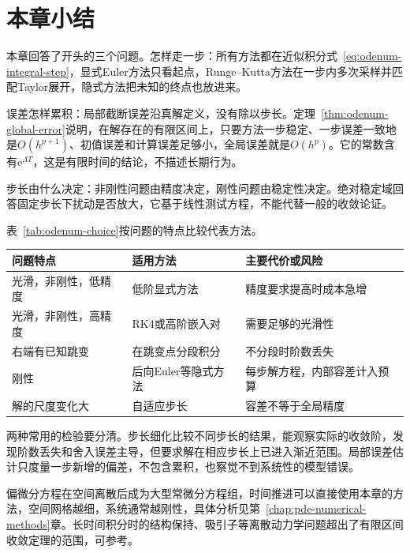 \section{本章小结}
\label{sec:odenum-summary}

本章回答了开头的三个问题。怎样走一步：所有方法都在近似积分式~\eqref{eq:odenum-integral-step}，显式Euler方法只看起点，Runge--Kutta方法在一步内多次采样并匹配Taylor展开，隐式方法把未知的终点也放进来。

误差怎样累积：局部截断误差沿真解定义，没有除以步长。定理~\ref{thm:odenum-global-error}说明，在解存在的有限区间上，只要方法一步稳定、一步误差一致地是$O(h^{p+1})$、初值误差和计算误差足够小，全局误差就是$O(h^{p})$。它的常数含有$\mathrm{e}^{\Lambda T}$，这是有限时间的结论，不描述长期行为。

步长由什么决定：非刚性问题由精度决定，刚性问题由稳定性决定。绝对稳定域回答固定步长下扰动是否放大，它基于线性测试方程，不能代替一般的收敛论证。

表~\ref{tab:odenum-choice}按问题的特点比较代表方法。

\begin{BookInlineTable}
 \centering
 \caption{方法选择的对比。}
 \label{tab:odenum-choice}
 \begin{tabular}{p{28mm}p{30mm}p{36mm}}
  \toprule
  问题特点 & 适用方法 & 主要代价或风险\\
  \midrule
  光滑，非刚性，低精度 & 低阶显式方法 & 精度要求提高时成本急增\\
  光滑，非刚性，高精度 & RK4或高阶嵌入对 & 需要足够的光滑性\\
  右端有已知跳变 & 在跳变点分段积分 & 不分段时阶数丢失\\
  刚性 & 后向Euler等隐式方法 & 每步解方程，内部容差计入预算\\
  解的尺度变化大 & 自适应步长 & 容差不等于全局精度\\
  \bottomrule
 \end{tabular}
\end{BookInlineTable}

两种常用的检验要分清。步长细化比较不同步长的结果，能观察实际的收敛阶，发现阶数丢失和舍入误差主导，但要求解在相应步长上已进入渐近范围。局部误差估计只度量一步新增的偏差，不包含累积，也察觉不到系统性的模型错误。

偏微分方程在空间离散后成为大型常微分方程组，时间推进可以直接使用本章的方法，空间网格越细，系统通常越刚性，具体分析见第~\ref{chap:pde-numerical-methods}章。长时间积分时的结构保持、吸引子等离散动力学问题超出了有限区间收敛定理的范围，可参考。
